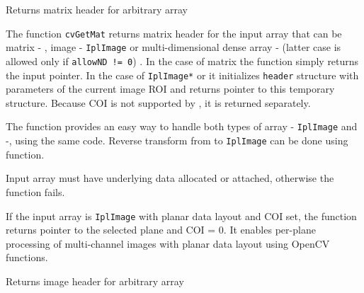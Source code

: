 \label{GetMat}

Returns matrix header for arbitrary array


\begin{description}
\end{description}

The function \texttt{cvGetMat} returns matrix header for the input array that can be matrix - , image - \texttt{IplImage} or multi-dimensional dense array -  (latter case is allowed only if \texttt{allowND != 0}) . In the case of matrix the function simply returns the input pointer. In the case of \texttt{IplImage*} or  it initializes \texttt{header} structure with parameters of the current image ROI and returns pointer to this temporary structure. Because COI is not supported by , it is returned separately.

The function provides an easy way to handle both types of array - \texttt{IplImage} and  -, using the same code. Reverse transform from  to \texttt{IplImage} can be done using  function.

Input array must have underlying data allocated or attached, otherwise the function fails.

If the input array is \texttt{IplImage} with planar data layout and COI set, the function returns pointer to the selected plane and COI = 0. It enables per-plane processing of multi-channel images with planar data layout using OpenCV functions.

\label{GetImage}

Returns image header for arbitrary array


